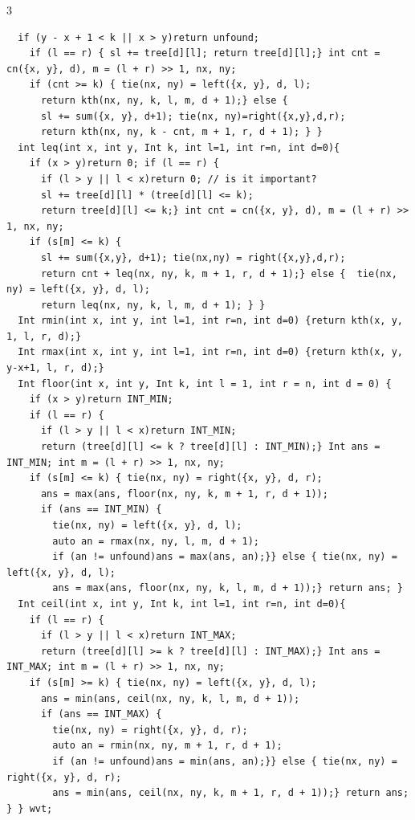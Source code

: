 \documentclass[8pt,a4paper,onesided]{article}
\begin{document}
\begin{multicols}{3}
\begin{verbatim}
  if (y - x + 1 < k || x > y)return unfound;
    if (l == r) { sl += tree[d][l]; return tree[d][l];} int cnt = cn({x, y}, d), m = (l + r) >> 1, nx, ny;
    if (cnt >= k) { tie(nx, ny) = left({x, y}, d, l);
      return kth(nx, ny, k, l, m, d + 1);} else {
      sl += sum({x, y}, d+1); tie(nx, ny)=right({x,y},d,r);
      return kth(nx, ny, k - cnt, m + 1, r, d + 1); } }
  int leq(int x, int y, Int k, int l=1, int r=n, int d=0){
    if (x > y)return 0; if (l == r) {
      if (l > y || l < x)return 0; // is it important?
      sl += tree[d][l] * (tree[d][l] <= k);
      return tree[d][l] <= k;} int cnt = cn({x, y}, d), m = (l + r) >> 1, nx, ny;
    if (s[m] <= k) {
      sl += sum({x,y}, d+1); tie(nx,ny) = right({x,y},d,r);
      return cnt + leq(nx, ny, k, m + 1, r, d + 1);} else {  tie(nx, ny) = left({x, y}, d, l);
      return leq(nx, ny, k, l, m, d + 1); } }
  Int rmin(int x, int y, int l=1, int r=n, int d=0) {return kth(x, y, 1, l, r, d);}
  Int rmax(int x, int y, int l=1, int r=n, int d=0) {return kth(x, y, y-x+1, l, r, d);}
  Int floor(int x, int y, Int k, int l = 1, int r = n, int d = 0) {
    if (x > y)return INT_MIN;
    if (l == r) {
      if (l > y || l < x)return INT_MIN;
      return (tree[d][l] <= k ? tree[d][l] : INT_MIN);} Int ans = INT_MIN; int m = (l + r) >> 1, nx, ny;
    if (s[m] <= k) { tie(nx, ny) = right({x, y}, d, r);
      ans = max(ans, floor(nx, ny, k, m + 1, r, d + 1));
      if (ans == INT_MIN) {
        tie(nx, ny) = left({x, y}, d, l);
        auto an = rmax(nx, ny, l, m, d + 1);
        if (an != unfound)ans = max(ans, an);}} else { tie(nx, ny) = left({x, y}, d, l);
        ans = max(ans, floor(nx, ny, k, l, m, d + 1));} return ans; }
  Int ceil(int x, int y, Int k, int l=1, int r=n, int d=0){
    if (l == r) {
      if (l > y || l < x)return INT_MAX;
      return (tree[d][l] >= k ? tree[d][l] : INT_MAX);} Int ans = INT_MAX; int m = (l + r) >> 1, nx, ny;
    if (s[m] >= k) { tie(nx, ny) = left({x, y}, d, l);
      ans = min(ans, ceil(nx, ny, k, l, m, d + 1));
      if (ans == INT_MAX) {
        tie(nx, ny) = right({x, y}, d, r);
        auto an = rmin(nx, ny, m + 1, r, d + 1);
        if (an != unfound)ans = min(ans, an);}} else { tie(nx, ny) = right({x, y}, d, r);
        ans = min(ans, ceil(nx, ny, k, m + 1, r, d + 1));} return ans;  } } wvt;
\end{verbatim}

\end{multicols}
\end{document}
